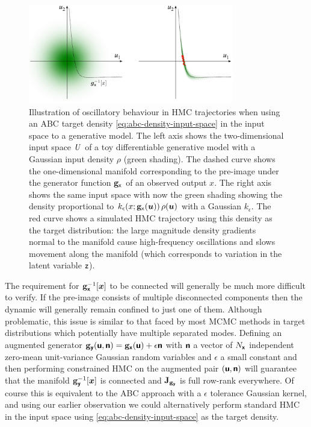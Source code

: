 \begin{figure}[!t]
\centering
\includegraphics[width=0.8\textwidth]{images/gaussian-abc-with-hmc-trajectory-gray}
\caption[Oscillatory Hamiltonian trajectory example.]{Illustration of oscillatory behaviour in \ac{HMC} trajectories when using an \ac{ABC} target density \eqref{eq:abc-density-input-space} in the input space to a generative model. The left axis shows the two-dimensional input space $\mathit{U}$ of a toy differentiable generative model with a Gaussian input density $\rho$ (green shading). The dashed curve shows the one-dimensional manifold corresponding to the pre-image under the generator function ${\mathbf{g}}_{\mathsf{x}}$ of an observed output $x$. The right axis shows the same input space with now the green shading showing the density proportional to $k_\epsilon\lpa x; \genfunc_{\rvar{x}}(\vct{u})\rpa \,\rho(\vct{u})$ with a Gaussian $k_\epsilon$. The red curve shows a simulated \ac{HMC} trajectory using this density as the target distribution: the large magnitude density gradients normal to the manifold cause high-frequency oscillations and slows movement along the manifold (which corresponds to variation in the latent variable $\mathsf{z}$).}
\label{fig:gaussian-abc-hmc-trajectory-example}
\end{figure}

The requirement for ${\mathbf{g}}_{\boldsymbol{\mathsf{x}}}^{-1}[\boldsymbol{x}]$ to be connected will generally be much more difficult to verify. If the pre-image consists of multiple disconnected components then the dynamic will generally remain confined to just one of them. Although problematic, this issue is similar to that faced by most \ac{MCMC} methods in target distributions which potentially have multiple separated modes. Defining an augmented generator ${\mathbf{g}}_{\boldsymbol{\mathsf{y}}}(\boldsymbol{\mathsf{u}},\boldsymbol{\mathsf{n}}) = {\mathbf{g}}_{\boldsymbol{\mathsf{x}}}(\boldsymbol{\mathsf{u}}) + \epsilon \boldsymbol{\mathsf{n}}$ with $\boldsymbol{\mathsf{n}}$ a vector of $N_{\boldsymbol{\mathsf{x}}}$ independent zero-mean unit-variance Gaussian random variables and $\epsilon$ a small constant and then performing constrained \ac{HMC} on the augmented pair $(\boldsymbol{\mathsf{u}},\boldsymbol{\mathsf{n}})$ will guarantee that the manifold ${\mathbf{g}}_{\boldsymbol{\mathsf{y}}}^{-1}[\boldsymbol{x}]$ is connected and $\mathbf{J}_{{\mathbf{g}}_{\boldsymbol{\mathsf{y}}}}$ is full row-rank everywhere. Of course this is equivalent to the \ac{ABC} approach with a $\epsilon$ tolerance Gaussian kernel, and using our earlier observation we could alternatively perform standard \ac{HMC} in the input space using \eqref{eq:abc-density-input-space} as the target density. 

